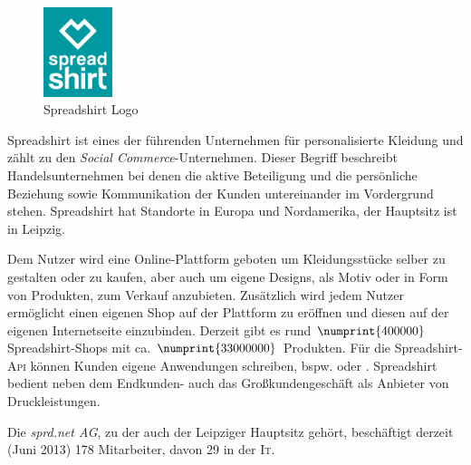 
\begin{figure}[!htb]
	\centering
		\includegraphics[width=2cm]{resources/sprd_logo_cmyk}
	\caption{Spreadshirt Logo}
	\label{fig:spreadshirtLogo}
\end{figure}

Spreadshirt ist eines der führenden Unternehmen für personalisierte Kleidung und zählt zu den \emph{Social Commerce}-Unternehmen. Dieser Begriff beschreibt Handelsunternehmen bei denen die aktive Beteiligung und die persönliche Beziehung sowie Kommunikation der Kunden untereinander im Vordergrund stehen. 
Spreadshirt hat Standorte in Europa und Nordamerika, der Hauptsitz ist in Leipzig. 

Dem Nutzer wird eine Online-Plattform geboten um Kleidungsstücke selber zu gestalten oder zu kaufen, aber auch um eigene Designs, als Motiv oder in Form von Produkten, zum Verkauf anzubieten. 
Zusätzlich wird jedem Nutzer ermöglicht einen eigenen Shop auf der Plattform zu eröffnen und diesen auf der eigenen Internetseite einzubinden. Derzeit gibt es rund $\numprint{400000}$ Spreadshirt-Shops mit ca. $\numprint{33000000}$ Produkten.
Für die Spreadshirt-\textsc{Api} können Kunden eigene Anwendungen schreiben, bspw.  \cite{zufallsshirt} oder  \cite{soundslikecotton}.
Spreadshirt bedient neben dem Endkunden- auch das Großkundengeschäft als Anbieter von Druckleistungen.

Die \emph{sprd.net AG}, zu der auch der Leipziger Hauptsitz gehört, beschäftigt derzeit (Juni 2013) 178 Mitarbeiter, davon 29 in der \textsc{It}.